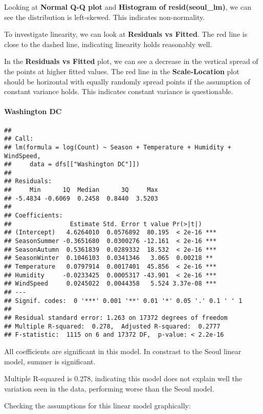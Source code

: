\documentclass[]{article}
\let\oldparagraph\paragraph
\renewcommand{\paragraph}[1]{\oldparagraph{#1}\mbox{}}
\begin{document}
Looking at \textbf{Normal Q-Q plot} and \textbf{Histogram of
resid(seoul\_lm)}, we can see the distribution is left-skewed. This
indicates non-normality.

To investigate linearity, we can look at \textbf{Residuals vs Fitted}.
The red line is close to the dashed line, indicating linearity holds
reasonably well.

In the \textbf{Residuals vs Fitted} plot, we can see a decrease in the
vertical spread of the points at higher fitted values. The red line in
the \textbf{Scale-Location} plot should be horizontal with equally
randomly spread points if the assumption of constant variance holds.
This indicates constant variance is questionable.

\hypertarget{washington-dc}{%
\paragraph{Washington DC}\label{washington-dc}}

\begin{verbatim}
## 
## Call:
## lm(formula = log(Count) ~ Season + Temperature + Humidity + WindSpeed, 
##     data = dfs[["Washington DC"]])
## 
## Residuals:
##     Min      1Q  Median      3Q     Max 
## -5.4834 -0.6069  0.2458  0.8440  3.5203 
## 
## Coefficients:
##                Estimate Std. Error t value Pr(>|t|)    
## (Intercept)   4.6264010  0.0576892  80.195  < 2e-16 ***
## SeasonSummer -0.3651680  0.0300276 -12.161  < 2e-16 ***
## SeasonAutumn  0.5361839  0.0289332  18.532  < 2e-16 ***
## SeasonWinter  0.1046103  0.0341346   3.065  0.00218 ** 
## Temperature   0.0797914  0.0017401  45.856  < 2e-16 ***
## Humidity     -0.0233425  0.0005317 -43.901  < 2e-16 ***
## WindSpeed     0.0245022  0.0044358   5.524 3.37e-08 ***
## ---
## Signif. codes:  0 '***' 0.001 '**' 0.01 '*' 0.05 '.' 0.1 ' ' 1
## 
## Residual standard error: 1.263 on 17372 degrees of freedom
## Multiple R-squared:  0.278,  Adjusted R-squared:  0.2777 
## F-statistic:  1115 on 6 and 17372 DF,  p-value: < 2.2e-16
\end{verbatim}

All coefficients are significant in this model. In constrast to the
Seoul linear model, summer is significant.

Multiple R-squared is 0.278, indicating this model does not explain well
the variation seen in the data, performing worse than the Seoul model.

Checking the assumptions for this linear model graphically:
\end{document}
